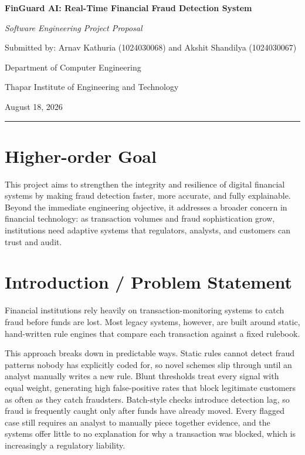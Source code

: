 \documentclass[11pt,letterpaper]{article}
\begin{document}
\begin{center}
    {\LARGE\bfseries FinGuard AI: Real-Time Financial Fraud Detection System}\par
    \vspace{5pt}
    {\large\itshape Software Engineering Project Proposal}\par
    \vspace{10pt}
    {\normalsize Submitted by: Arnav Kathuria (1024030068) and Akshit Shandilya (1024030067)}\par
    {\normalsize Department of Computer Engineering}\par
    {\normalsize Thapar Institute of Engineering and Technology}\par
    {\normalsize August 18, 2026}
\end{center}

\vspace{7pt}
\hrule
\vspace{5pt}

\section{Higher-order Goal}
This project aims to strengthen the integrity and resilience of digital financial systems by making fraud detection faster, more accurate, and fully explainable. Beyond the immediate engineering objective, it addresses a broader concern in financial technology: as transaction volumes and fraud sophistication grow, institutions need adaptive systems that regulators, analysts, and customers can trust and audit.

\section{Introduction / Problem Statement}
Financial institutions rely heavily on transaction-monitoring systems to catch fraud before funds are lost. Most legacy systems, however, are built around static, hand-written rule engines that compare each transaction against a fixed rulebook.

This approach breaks down in predictable ways. Static rules cannot detect fraud patterns nobody has explicitly coded for, so novel schemes slip through until an analyst manually writes a new rule. Blunt thresholds treat every signal with equal weight, generating high false-positive rates that block legitimate customers as often as they catch fraudsters. Batch-style checks introduce detection lag, so fraud is frequently caught only after funds have already moved. Every flagged case still requires an analyst to manually piece together evidence, and the systems offer little to no explanation for why a transaction was blocked, which is increasingly a regulatory liability.
\end{document}
